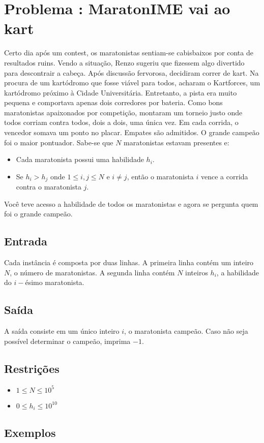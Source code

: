 \section*{Problema \proxLetra: MaratonIME vai ao kart}

Certo dia após um contest, os maratonistas sentiam-se cabisbaixos por conta de resultados ruins. Vendo a situação, Renzo sugeriu que fizessem algo divertido para descontrair a cabeça. Após discussão fervorosa, decidiram correr de kart. Na procura de um kartódromo que fosse viável para todos, acharam o Kartforces, um kartódromo próximo à Cidade Universitária. Entretanto, a pista era muito pequena e comportava apenas dois corredores por bateria. Como bons maratonistas apaixonados por competição, montaram um torneio justo onde todos corriam contra todos, dois a dois, uma única vez. Em cada corrida, o vencedor somava um ponto no placar. Empates são admitidos. O grande campeão foi o maior pontuador. Sabe-se que $N$ maratonistas estavam presentes e:

\begin{itemize}
	\item Cada maratonista possui uma habilidade $h_i$.
	\item Se $h_i > h_j$ onde $1 \leq i,j \leq N$ e $i \neq j$, então o maratonista $i$ vence a corrida contra o maratonista $j$.
\end{itemize}

Você teve acesso a habilidade de todos os maratonistas e agora se pergunta quem foi o grande campeão.

\subsection*{Entrada}
\textoDiversasInstanciasEOF

Cada instância é composta por duas linhas. 
A primeira linha contém um inteiro $N$, o número de maratonistas.
A segunda linha contém $N$ inteiros $h_i$, a habilidade do $i-$ésimo maratonista. 


\subsection*{Saída}

A saída consiste em um único inteiro $i$, o maratonista campeão. Caso não seja possível determinar o campeão, imprima $-1$.


\subsection*{Restrições}
\begin{itemize}
  \item $1 \leq N \leq 10^5$
  \item $0 \leq h_i \leq 10^{10}$
\end{itemize}

\subsection*{Exemplos}

